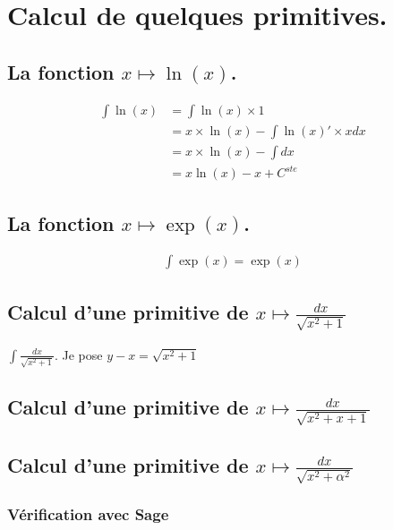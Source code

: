 \documentclass[a4paper,12pt]{report}
\begin{document}



\chapter{Calcul de quelques primitives.}

\section{La fonction  $x \mapsto \ln(x) $.}

\begin{align*}
\int \ln(x) & =  \int \ln(x) \times 1 \\ & =  x \times \ln(x) - \int \ln(x)' \times x dx \\ & =  x \times \ln(x) - \int  dx \\ & =   x  \ln(x) - x + C^{ste}
\end{align*}


\section{La fonction  $x \mapsto \exp(x) $.}


\begin{align*}
\int \exp(x) = \exp(x)
\end{align*}






\section{Calcul d'une primitive de $ x \longmapsto  \frac{dx}{\sqrt{x^2 + 1} } $ }


$\int \frac{dx}{\sqrt{x^2 + 1}}$. Je pose $y-x = \sqrt{x^2+1} $


\section{Calcul d'une primitive de $  x \longmapsto  \frac{dx}{\sqrt{x^2+ x + 1} } $ }




\section{Calcul d'une primitive de $  x \longmapsto  \frac{dx}{\sqrt{x^2+ \alpha^2} } $ }

\subsection{Vérification avec Sage}
\end{document}
